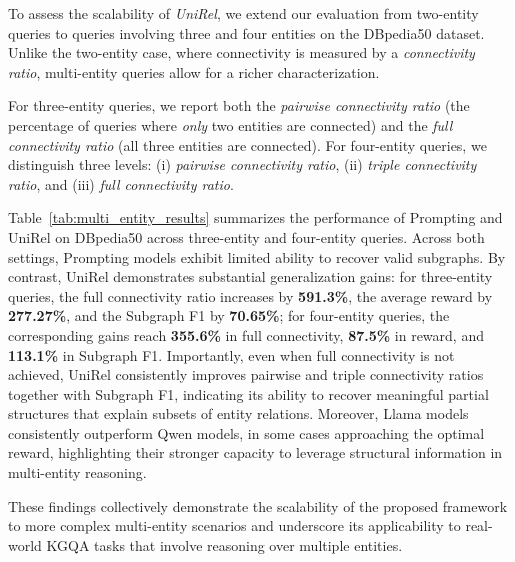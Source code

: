 To assess the scalability of \textit{UniRel}, we extend our evaluation from two-entity queries to queries involving three and four entities on the DBpedia50 dataset.
Unlike the two-entity case, where connectivity is measured by a \emph{connectivity ratio}, multi-entity queries allow for a richer characterization.

For three-entity queries, we report both the \emph{pairwise connectivity ratio} (the percentage of queries where \textit{only} two entities are connected) and the \emph{full connectivity ratio} (all three entities are connected).
For four-entity queries, we distinguish three levels: (i) \emph{pairwise connectivity ratio}, (ii) \emph{triple connectivity ratio}, and (iii) \emph{full connectivity ratio}.


Table~\ref{tab:multi_entity_results} summarizes the performance of Prompting and UniRel on DBpedia50 across three-entity and four-entity queries.
Across both settings, Prompting models exhibit limited ability to recover valid subgraphs.
By contrast, UniRel demonstrates substantial generalization gains: for three-entity queries, the full connectivity ratio increases by \textbf{591.3\%}, the average reward by \textbf{277.27\%}, and the Subgraph F1 by \textbf{70.65\%};
for four-entity queries, the corresponding gains reach \textbf{355.6\%} in full connectivity, \textbf{87.5\%} in reward, and \textbf{113.1\%} in Subgraph F1.
Importantly, even when full connectivity is not achieved, UniRel consistently improves pairwise and triple connectivity ratios together with Subgraph F1, indicating its ability to recover meaningful partial structures that explain subsets of entity relations.
Moreover, Llama models consistently outperform Qwen models, in some cases approaching the optimal reward, highlighting their stronger capacity to leverage structural information in multi-entity reasoning.

These findings collectively demonstrate the scalability of the proposed framework to more complex multi-entity scenarios and underscore its applicability to real-world KGQA tasks that involve reasoning over multiple entities. 


